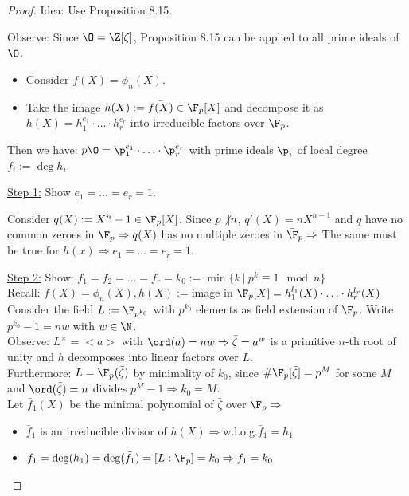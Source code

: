 


\begin{proof}
Idea: Use Proposition 8.15.

Observe: Since $\O = \Z[\zeta]$, Proposition 8.15 can be applied to all prime ideals of $\O$.
\begin{itemize}
	\item Consider $f(X) = \phi_n(X)$.
	
	\item Take the image $h(X) := \bar{f(X)} \in \F_p[X]$ and decompose it as $h(X) = h_1^{e_1} \cdot \ldots \cdot h_r^{e_r}$ into irreducible factors over $\F_p$.
\end{itemize}
Then we have: $p \O = \p_1^{e_1} \cdot \ldots \cdot \p_r^{e_r}$ with prime ideals $\p_i$ of local degree $f_i := \deg h_i$.
	
\bigskip
	
\underline{Step 1:} Show $e_1 = \dots = e_r = 1$.

Consider $q(X) := X^n -1 \in \F_p[X]$. Since $p \not\vert n$, $q'(X) = nX^{n-1}$ and $q$ have no common zeroes in $\F_p \Rightarrow q(X)$ has no multiple zeroes in $\bar{\F}_p \Rightarrow $ The same must be true for $h(x) \Rightarrow e_1 = \dots = e_r = 1$.

\bigskip

\underline{Step 2:} Show: $f_1=f_2= \dots=f_r=k_0:=\min \{ k \ | \ p^k \equiv 1 \mod n \}$\\
Recall: $f(X)= \phi_n(X), h(X):=$image in $\F_p[X]=h_1^{l_1}(X)\cdot \ldots \cdot h_r^{l_r}(X)$\\
Consider the field $L:= \F_{p^{k_0}}$ with $p^{k_0}$ elements as field extension of $\F_p$.
Write $p^{k_0}-1= nw$ with $w \in \N$.\\
Observe: $L^\times = <a>$ with $\ord(a)=nw \Rightarrow \bar{\zeta}=a^w$ is a primitive $n$-th root of unity and $h$ decomposes into linear factors over $L$.\\
Furthermore: $L=\F_p(\bar{\zeta})$ by minimality of $k_0$, since $\# \F_p[\bar{\zeta}] = p^M$ for some $M$ and $\ord(\bar{\zeta})=n$ divides $p^M-1 \Rightarrow k_0=M$.\\
Let $\bar{f}_1(X)$ be the minimal polynomial of $\bar{\zeta}$ over $\F_p \Rightarrow$
\begin{itemize}
\item $\bar{f}_1$ is an irreducible divisor of $h(X) \Rightarrow $w.l.o.g.$ \bar{f}_1 = h_1$
\item $f_1=\deg(h_1)=\deg(\bar{f_1})=[L:\F_p]=k_0 \Rightarrow f_1=k_0$
\end{itemize}
\end{proof}

